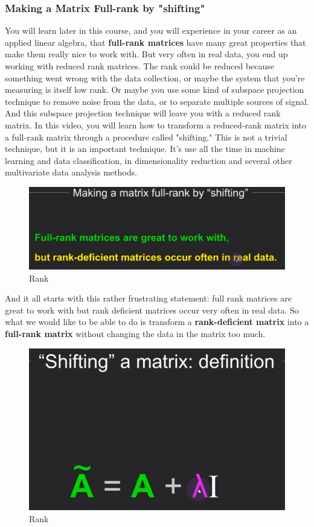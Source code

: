 \documentclass[fleqn,10pt]{olplainarticle}
\theoremstyle{definition}
\theoremstyle{remark}
\begin{document}
\pagebreak

\subsubsection*{Making a Matrix Full-rank by "shifting"}

You will learn later in this course, and you will experience in your career as an applied linear algebra, that \textbf{full-rank matrices} have many great properties that make them really nice to work with. But very often in real data, you end up working with reduced rank matrices. The rank could be reduced because something went wrong with the data collection, or maybe the system that you're measuring is itself low rank. Or maybe you use some kind of subspace projection technique to remove noise from the data, or to separate multiple sources of signal. And this subspace projection technique will leave you with a reduced rank matrix. In this video, you will learn how to transform a reduced-rank matrix into a full-rank matrix through a procedure called "shifting." This is not a trivial technique, but it is an important technique. It's use all the time in machine learning and data classification, in dimensionality reduction and several other multivariate data analysis methods.

\begin{figure}[ht]
	\centering
	\includegraphics[width=0.5\linewidth]{images/rank-28.png}
	\caption{Rank}
	\label{fig:rank_28}
\end{figure}

And it all starts with this rather frustrating statement: full rank matrices are great to work with but rank deficient matrices occur very often in real data. So what we would like to be able to do is transform a \textbf{rank-deficient matrix} into a \textbf{full-rank matrix} without changing the data in the matrix too much.

\begin{figure}[ht]
	\centering
	\includegraphics[width=0.3\linewidth]{images/rank-29.png}
	\caption{Rank}
	\label{fig:rank_29}
\end{figure}
\end{document}
